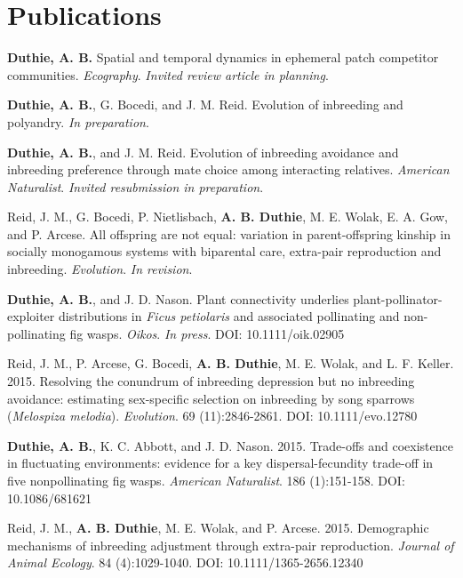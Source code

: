 \documentclass[letterpaper]{article}
\renewenvironment{itemize}{
  \begin{list}{}{
    \setlength{\leftmargin}{1.5em}
  }
}{
  \end{list}
}
\begin{document}
\section*{Publications}
\begin{itemize}
\item {\bf Duthie, A. B.} Spatial and temporal dynamics in ephemeral patch competitor communities. {\it Ecography}. {\it Invited review article in planning}.
\item {\bf Duthie, A. B.}, G. Bocedi, and J. M. Reid. Evolution of inbreeding and polyandry. {\it In preparation}.
\item {\bf Duthie, A. B.}, and J. M. Reid. Evolution of inbreeding avoidance and inbreeding preference through mate choice among interacting relatives. {\it American Naturalist}. {\it Invited resubmission in preparation}.
\item Reid, J. M., G. Bocedi, P. Nietlisbach, {\bf A. B. Duthie}, M. E. Wolak, E. A. Gow, and P. Arcese. All offspring are not equal: variation in parent-offspring kinship in socially monogamous systems with biparental care, extra-pair reproduction and inbreeding. {\it Evolution}. {\it In revision}.
\item {\bf Duthie, A. B.}, and J. D. Nason. Plant connectivity underlies plant-pollinator-exploiter distributions in {\it Ficus petiolaris} and associated pollinating and non-pollinating fig wasps. {\it Oikos}. {\it In press}. DOI: 10.1111/oik.02905
\item Reid, J. M., P. Arcese, G. Bocedi, {\bf A. B. Duthie}, M. E. Wolak, and L. F. Keller. 2015. Resolving the conundrum of inbreeding depression but no inbreeding avoidance: estimating sex-specific selection on inbreeding by song sparrows ({\it Melospiza melodia}). {\it Evolution}. 69 (11):2846-2861. DOI: 10.1111/evo.12780
\item {\bf Duthie, A. B.}, K. C. Abbott, and J. D. Nason. 2015. Trade-offs and coexistence in fluctuating environments: evidence for a key dispersal-fecundity trade-off in five nonpollinating fig wasps. {\it American Naturalist}. 186 (1):151-158. DOI: 10.1086/681621
\item Reid, J. M., {\bf A. B. Duthie}, M. E. Wolak, and P. Arcese. 2015. Demographic mechanisms of inbreeding adjustment through extra-pair reproduction. {\it Journal of Animal Ecology}. 84 (4):1029-1040. DOI: 10.1111/1365-2656.12340

\end{itemize}
\end{document}
